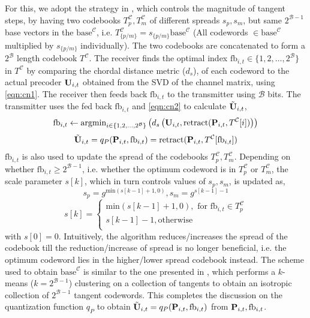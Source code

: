 \documentclass[conference]{IEEEtran}
\begin{document}
For this, we adopt the strategy in \cite{6891198}, which controls the magnitude of tangent steps, by having two codebooks $T^{\mathcal{C}}_p,T^{\mathcal{C}}_m$ of different spreads $s_p,s_m$, but same $2^{\mathcal{B}-1}$ base vectors in the $\text{base}^{\mathcal{C}}$, i.e. $T^{\mathcal{C}}_{\{p/m\}}=s_{\{p/m\}}\text{base}^{\mathcal{C}}$ (All codewords $\in \text{base}^{\mathcal{C}}$ multiplied by $s_{\{p/m\}}$ individually).
The two codebooks are concatenated to form a $2^\mathcal{B}$ length codebook $T^\mathcal{C}$.
The receiver finds the optimal index $\text{fb}_{i,t} \in \{1,2,\ldots,2^{\mathcal{B}}\}$ in $T^\mathcal{C}$ by comparing the chordal distance metric ($d_s$), of each codeword to the actual precoder ${\bf U}_{i,t}$ obtained from the SVD of the channel matrix, using \eqref{eqn:cn1}. The receiver then feeds back $\text{fb}_{i,t}$ to the transmitter using $\mathcal{B}$ bits. The transmitter uses the fed back $\text{fb}_{i,t}$ and \eqref{eqn:cn2} to calculate $\tilde{{\bf U}}_{i,t}$,
\begin{equation}
\label{eqn:cn1}
\text{fb}_{i,t} \gets \text{argmin}_{i \in \{1,2,\ldots,2^{\mathcal{B}}\}}\left (d_s\left (\bU_{i,t},\text{retract}(\bP_{i,t},T^\mathcal{C}[i])\right ) \right)
\end{equation}
\begin{equation}
\tilde{\bU}_{i,t}=q_P(\bP_{i,t},\text{fb}_{i,t})=\text{retract}(\bP_{i,t},T^\mathcal{C}[\text{fb}_{i,t}])
\label{eqn:cn2}
\end{equation}
$\text{fb}_{i,t}$ is also used to update the spread of the codebooks $T^{\mathcal{C}}_p,T^{\mathcal{C}}_m$.
Depending on whether $\text{fb}_{i,t} \geq 2^{\mathcal{B}-1}$, i.e. whether the optimum codeword is in $T^{\mathcal{C}}_p$ or $T^{\mathcal{C}}_m$, the scale parameter $s[k]$, which in turn controls values of $s_p, s_m$, is updated as,
$$s_p=g^{\text{min}(s[k-1]+1,0)}, s_m = g^{s[k-1]-1}$$
$$
s[k]=
\begin{cases}
\text{min}(s[k-1]+1,0), \text{ for } \text{fb}_{i,t} \in T^{\mathcal{C}}_p\\
s[k-1]-1, \text{otherwise}\\
\end{cases}
$$
with $s[0]=0$.
Intuitively, the algorithm reduces/increases the spread of the codebook till the reduction/increase of spread is no longer beneficial, i.e. the optimum codeword lies in the higher/lower spread codebook instead.
The scheme used to obtain $\text{base}^{\mathcal{C}}$ is similar to the one presented in \cite{Gupt1905:Predictive}, which performs a $k$-means ($k=2^{\mathcal{B}-1}$) clustering on a collection of tangents to obtain an isotropic collection of $2^{\mathcal{B}-1}$ tangent codewords.
This completes the discussion on the quantization function $q_P$ to obtain $\tilde{{\bf U}}_{i,t}=q_P({\bf P}_{i,t},\text{fb}_{i,t})$ from ${\bf P}_{i,t},\text{fb}_{i,t}$.
\end{document}
